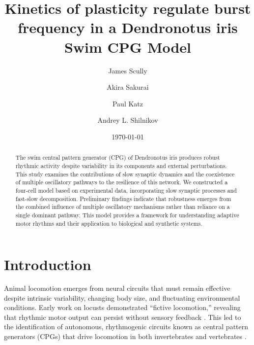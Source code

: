 \documentclass[nofootinbib,aip,amsmath,amssymb,reprint,twocolumn,10pt]{revtex4-2}
\begin{document}
\title{Kinetics of plasticity regulate burst frequency in a Dendronotus iris Swim CPG Model}

\author{James Scully}
\author{Akira Sakurai}
\author{Paul Katz}
\author{Andrey L. Shilnikov}


\date{\today}
\begin{abstract}


The swim central pattern generator (CPG) of Dendronotus iris produces robust rhythmic activity despite variability in its components and external perturbations.
This study examines the contributions of slow synaptic dynamics and the coexistence of multiple oscillatory pathways to the resilience of this network.
We constructed a four-cell model based on experimental data, incorporating slow synaptic processes and fast-slow decomposition.
Preliminary findings indicate that robustness emerges from the combined influence of multiple oscillatory mechanisms rather than reliance on a single dominant pathway.
This model provides a framework for understanding adaptive motor rhythms and their application to biological and synthetic systems.
\end{abstract}

\maketitle
\section{Introduction}
Animal locomotion emerges from neural circuits that must remain effective despite intrinsic variability, changing body size, and fluctuating environmental conditions.
Early work on locusts demonstrated ``fictive locomotion,'' revealing that rhythmic motor output can persist without sensory feedback \cite{Wilson1961}.
This led to the identification of autonomous, rhythmogenic circuits known as central pattern generators (CPGs) that drive locomotion in both invertebrates and vertebrates \cite{MarderCalabrese1996, Kiehn2006}.
\end{document}
